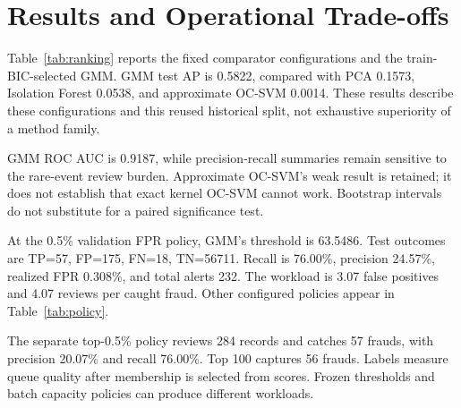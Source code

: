 \documentclass[conference]{IEEEtran}
\begin{document}
\section{Results and Operational Trade-offs}
Table~\ref{tab:ranking} reports the fixed comparator configurations and the train-BIC-selected GMM. GMM test AP is 0.5822, compared with PCA 0.1573, Isolation Forest 0.0538, and approximate OC-SVM 0.0014. These results describe these configurations and this reused historical split, not exhaustive superiority of a method family.

GMM ROC AUC is 0.9187, while precision-recall summaries remain sensitive to the rare-event review burden. Approximate OC-SVM's weak result is retained; it does not establish that exact kernel OC-SVM cannot work. Bootstrap intervals do not substitute for a paired significance test.

At the 0.5\% validation FPR policy, GMM's threshold is 63.5486. Test outcomes are TP=57, FP=175, FN=18, TN=56711. Recall is 76.00\%, precision 24.57\%, realized FPR 0.308\%, and total alerts 232. The workload is 3.07 false positives and 4.07 reviews per caught fraud. Other configured policies appear in Table~\ref{tab:policy}.

The separate top-0.5\% policy reviews 284 records and catches 57 frauds, with precision 20.07\% and recall 76.00\%. Top 100 captures 56 frauds. Labels measure queue quality after membership is selected from scores. Frozen thresholds and batch capacity policies can produce different workloads.
\end{document}

